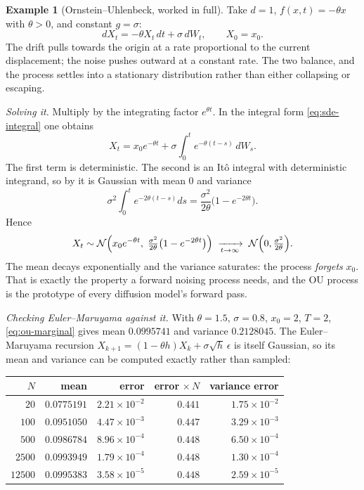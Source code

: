 \documentclass[11pt,a4paper]{report}
\theoremstyle{definition}
\newtheorem{example}[example]{Example}
\theoremstyle{remark}
\begin{document}
\begin{example}[Ornstein--Uhlenbeck, worked in full]
\label{ex:ou-process}
Take $d=1$, $f(x,t)=-\theta x$ with $\theta>0$, and constant $g=\sigma$:
\begin{equation}
\label{eq:ou}
dX_t = -\theta X_t\,dt + \sigma\,dW_t,\qquad X_0=x_0 .
\end{equation}
The drift pulls towards the origin at a rate proportional to the current
displacement; the noise pushes outward at a constant rate. The two balance,
and the process settles into a stationary distribution rather than either
collapsing or escaping.

\emph{Solving it.} Multiply by the integrating factor $e^{\theta t}$. In the
integral form \eqref{eq:sde-integral} one obtains
\[
X_t = x_0e^{-\theta t} + \sigma\int_0^t e^{-\theta(t-s)}\,dW_s .
\]
The first term is deterministic. The second is an It\^o integral with
deterministic integrand, so by  it is Gaussian with
mean $0$ and variance
\[
\sigma^2\int_0^t e^{-2\theta(t-s)}ds
= \frac{\sigma^2}{2\theta}\bigl(1-e^{-2\theta t}\bigr).
\]
Hence
\begin{equation}
\label{eq:ou-marginal}
X_t \sim \mathcal N\Bigl(x_0e^{-\theta t},\;
\tfrac{\sigma^2}{2\theta}\bigl(1-e^{-2\theta t}\bigr)\Bigr)
\;\xrightarrow[t\to\infty]{}\;
\mathcal N\Bigl(0,\tfrac{\sigma^2}{2\theta}\Bigr).
\end{equation}
The mean decays exponentially and the variance saturates: the process
\emph{forgets} $x_0$. That is exactly the property a forward noising process
needs, and the OU process is the prototype of every diffusion model's
forward pass.

\emph{Checking Euler--Maruyama against it.} With $\theta=1.5$,
$\sigma=0.8$, $x_0=2$, $T=2$, \eqref{eq:ou-marginal} gives mean
$0.0995741$ and variance $0.2128045$. The Euler--Maruyama recursion
$X_{k+1}=(1-\theta h)X_k+\sigma\sqrt h\,\epsilon$ is itself Gaussian, so its
mean and variance can be computed exactly rather than sampled:

\begin{center}
\begin{tabular}{rrrrr}
\toprule
$N$ & mean & error & error$\,\times N$ & variance error \\
\midrule
$20$ & $0.0775191$ & $2.21\times10^{-2}$ & $0.441$ & $1.75\times10^{-2}$ \\
$100$ & $0.0951050$ & $4.47\times10^{-3}$ & $0.447$ & $3.29\times10^{-3}$ \\
$500$ & $0.0986784$ & $8.96\times10^{-4}$ & $0.448$ & $6.50\times10^{-4}$ \\
$2500$ & $0.0993949$ & $1.79\times10^{-4}$ & $0.448$ & $1.30\times10^{-4}$ \\
$12500$ & $0.0995383$ & $3.58\times10^{-5}$ & $0.448$ & $2.59\times10^{-5}$ \\
\bottomrule
\end{tabular}
\end{center}


\end{example}
\end{document}
